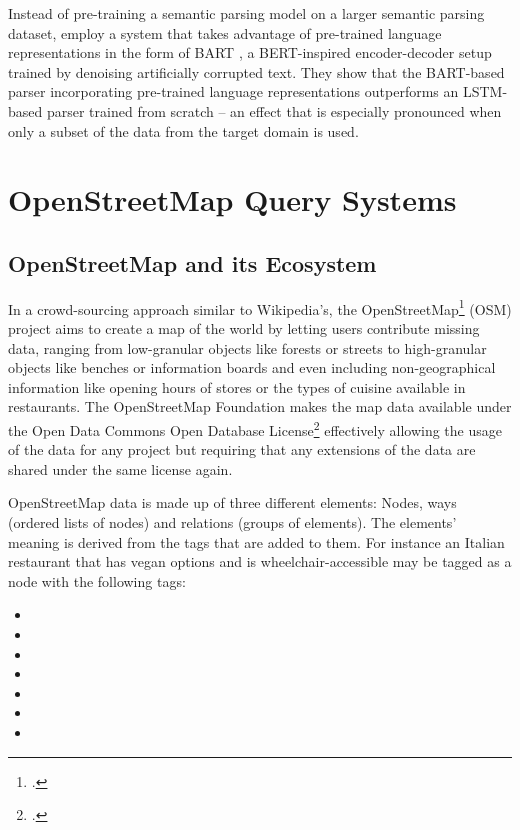 Instead of pre-training a semantic parsing model on a larger semantic parsing
dataset, \textcite{chen-2020} employ a system that takes advantage of
pre-trained language representations in the form of BART \parencite{lewis-2020},
a BERT-inspired encoder-decoder setup trained by denoising artificially
corrupted text. They show that the BART-based parser incorporating pre-trained
language representations outperforms an LSTM-based \parencite{hochreiter-1997}
parser trained from scratch – an effect that is especially pronounced when only
a subset of the data from the target domain is used.

\section{OpenStreetMap Query Systems}

\subsection{OpenStreetMap and its Ecosystem}
\label{sec:osm}

In a crowd-sourcing approach similar to Wikipedia’s, the
OpenStreetMap\footcite{openstreetmap} (OSM) project aims to create a map of the
world by letting users contribute missing data, ranging from low-granular
objects like forests or streets to high-granular objects like benches or
information boards and even including non-geographical information like opening
hours of stores or the types of cuisine available in restaurants. The
OpenStreetMap Foundation makes the map data available under the Open Data
Commons Open Database License\footcite{odbl} effectively allowing the usage of
the data for any project but requiring that any extensions of the data are
shared under the same license again.

OpenStreetMap data is made up of three different elements: Nodes, ways (ordered
lists of nodes) and relations (groups of elements). The elements’ meaning is
derived from the tags that are added to them. For instance an Italian restaurant
that has vegan options and is wheelchair-accessible may be tagged as a node with
the following tags:

\begin{itemize}
\item {}
\item {}
\item {}
\item {}
\item {}
\item {}
\item {}
\end{itemize}

